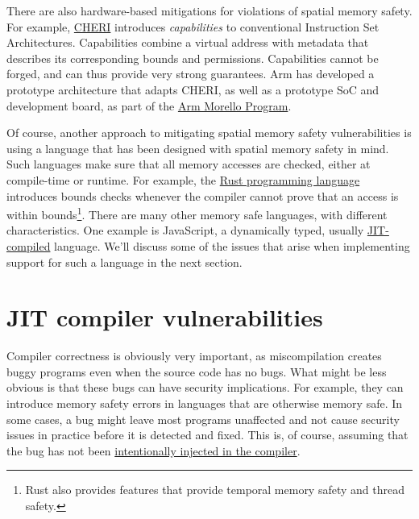 \documentclass[
  a4paper,
]{report}
\begin{document}
There are also hardware-based mitigations for violations of spatial
memory safety. For example,
\href{https://www.cl.cam.ac.uk/research/security/ctsrd/cheri/}{CHERI}
introduces
\emph{\label{__index_entry_90}{capabilities}}
to conventional Instruction Set Architectures. Capabilities combine a
virtual address with metadata that describes its corresponding bounds
and permissions. Capabilities cannot be forged, and can thus provide
very strong guarantees. Arm has developed a prototype architecture that
adapts CHERI, as well as a prototype SoC and development board, as part
of the \href{https://www.arm.com/architecture/cpu/morello}{Arm Morello
Program}.

Of course, another approach to mitigating spatial memory safety
vulnerabilities is using a language that has been designed with spatial
memory safety in mind. Such languages make sure that all memory accesses
are checked, either at compile-time or runtime. For example, the
\href{https://www.rust-lang.org/}{Rust programming language} introduces
bounds checks whenever the compiler cannot prove that an access is
within bounds\footnote{Rust also provides features that provide temporal
  memory safety and thread safety.}. There are many other memory safe
languages, with different characteristics. One example is JavaScript, a
dynamically typed, usually
\hyperref[jit-compiler-vulnerabilities]{JIT-compiled} language. We'll
discuss some of the issues that arise when implementing support for such
a language in the next section.

\section{JIT compiler
vulnerabilities}\label{sec:jit-compiler-vulnerabilities}

Compiler correctness is obviously very important, as miscompilation
creates buggy programs even when the source code has no bugs. What might
be less obvious is that these bugs can have security implications. For
example, they can introduce memory safety errors in languages that are
otherwise memory safe. In some cases, a bug might leave most programs
unaffected and not cause security issues in practice before it is
detected and fixed. This is, of course, assuming that the bug has not
been \hyperref[supply-chain-attacks]{intentionally injected in the
compiler}.
\end{document}
